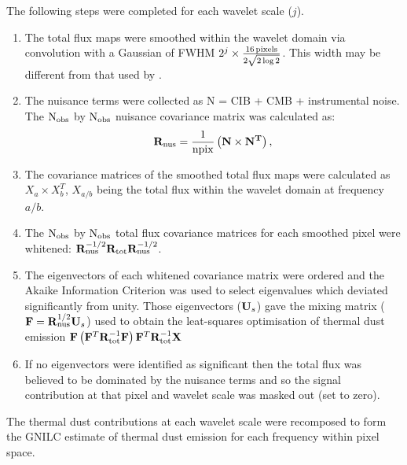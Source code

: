 \documentclass[a4paper,fleqn,usenatbib]{mnras}
\begin{document}
The following steps were completed for each wavelet scale ($j$). 
\begin{enumerate}[label*=\arabic*, nolistsep]
 \item The total flux maps were smoothed within the wavelet domain via convolution with a Gaussian of FWHM $2^{j} \times \frac{16\, \rm{pixels}}{2 \sqrt{2 \log{2}}}$. This width may be different from that used by \citet{gnilc}.  
 \item The nuisance terms were collected as N = CIB + CMB + instrumental noise. The $\rm{N_{obs}}$ by $\rm{N_{obs}}$ nuisance covariance matrix was calculated as:
\begin{equation}
{\bf{R}}_{{\rm{nus}}} = \frac{1}{\rm{npix}} \left({\bf{N \times N^{T} }} \right),  
\end{equation}     
 \item The covariance matrices of the smoothed total flux maps were calculated as $X_{a} \times X_{b}^{T} $, $X_{a/b}$ being the total flux within the wavelet domain at frequency $a/b$.
\item The $\rm{N_{obs}}$ by $\rm{N_{obs}}$ total flux covariance matrices for each smoothed pixel were whitened: ${\bf{R}}_{{\rm{nus}}}^{-1/2} {\bf{R}}_{{\rm{tot}}} {\bf{R}}_{{\rm{nus}}}^{-1/2}$.
\item The eigenvectors of each whitened covariance matrix were ordered and the Akaike Information Criterion was used to select eigenvalues which deviated significantly from unity. Those eigenvectors (${\bf{U}}_{s}$) gave the mixing matrix (${\bf{F}} = {\bf{R}}_{{\rm{nus}}}^{1/2} {\bf{U}}_{s} $) used to obtain the leat-squares optimisation of thermal dust emission ${\bf{F}} \left( {\bf{F}}^{T} {\bf{R}}_{{\rm{tot}}}^{-1} {\bf{F}} \right) {\bf{F}}^{T} {\bf{R}}_{{\rm{tot}}}^{-1} {\bf{X}}$ 
\item If no eigenvectors were identified as significant then the total flux was believed to be dominated by the nuisance terms and so the signal contribution at that pixel and wavelet scale was masked out (set to zero). 
\end{enumerate}
The thermal dust contributions at each wavelet scale were recomposed to form the GNILC estimate of thermal dust emission for each frequency within pixel space. 



\bsp	%
\label{lastpage}
\end{document}
